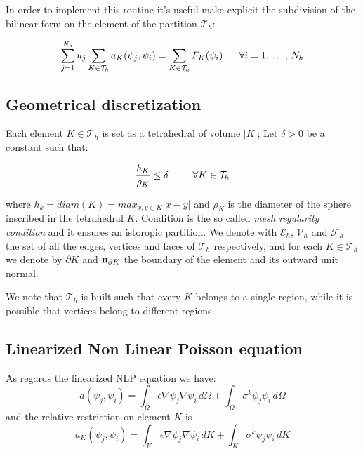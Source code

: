 In order to implement this routine it's useful make explicit the subdivision of the bilinear form on the element of the partition $\mathcal{T}_h$:

\begin{equation}
\label{eq: sistema algebrico in sommatoria}
\sum_{j=1}^{N_h}u_j\sum_{K\in \mathcal{T}_h}a_K(\psi_j,\psi_i) = \sum_{K\in \mathcal{T}_h}F_K(\psi_i) \psp{10} \forall i = 1, \, . \, . \, . \, , \, N_h
\end{equation}


\subsection{Geometrical discretization}

Each element $K\in \mathcal{T}_h$ is set as a tetrahedral of volume $|K|$; Let $\delta>0$ be a constant such that:

\begin{equation}
\label{eq: mesh regular condition}
\dfrac{h_K}{\rho_K} \leq \delta \psp{15} \forall K \in \mathcal{T}_h
\end{equation}

where $h_k=diam(K)=max_{x,y\in K}|x-y|$ and $\rho_K$ is the diameter of the sphere inscribed in the tetrahedral $K$. Condition  is the so called \textit{mesh regularity condition} \cite{quarteroni:modnum} and it ensures an istoropic partition.
We denote with $\mathcal{E}_h$, $\mathcal{V}_h$ and $\mathcal{F}_h$ the set of all the edges, vertices and faces  
of $\mathcal{T}_h$ respectively, and for each $K\in \mathcal{T}_h$ we denote by $\partial K$ and $\mathbf{n}_{\partial K}$ the boundary of the element and its outward unit normal.
  
We note that $\mathcal{T}_h$ is built such that every $K$ belongs to a single region, while it is possible that vertices belong to different regions.  
 
 \subsection{Linearized Non Linear Poisson equation}

As regards the linearized NLP equation we have:
\begin{equation}
a(\psi_j,\psi_i)  = \int_{\Omega} \epsilon \nabla \psi_j \nabla \psi_i \, d\Omega + \int_{\Omega} \sigma^{k}\psi_j \psi_i \, d\Omega 
\end{equation}
and the relative restriction on element $K$ is
\begin{equation}
\label{eq: bilinear local discrete}
a_K(\psi_j,\psi_i)  = \int_{K} \epsilon \nabla \psi_j \nabla \psi_i \, dK + \int_{K} \sigma^{k}\psi_j \psi_i \, dK
\end{equation}

